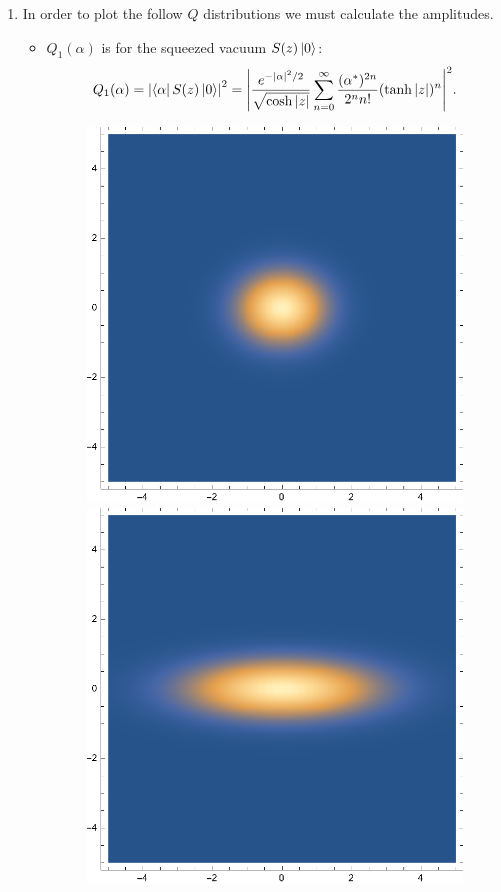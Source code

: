 \documentclass{article}
\theoremstyle{definition}
\newcommand{\al}{\alpha}
\newcommand{\f}[2]{\frac{#1}{#2}}
\begin{document}
\begin{enumerate}[label=(\alph*)]
\item In order to plot the follow $Q$ distributions we must calculate the amplitudes. 

\begin{itemize}

\item $Q_1(\al)$ is for the squeezed vacuum $S(z) \ket{0}$:
\begin{align*}
Q_1(\al) = \abs{\bra{\al} S(z) \ket{0}}^2 = \abs{\f{e^{-\abs{\al}^2/2}}{\sqrt{\cosh |z|}} \sum_{n=0}^\infty \f{(\al^*)^{2n}}{2^n n!} (\tanh |z|)^n}^2.
\end{align*}

\begin{figure}[!htb]
	\centering
	\begin{minipage}{.3\textwidth}
  	\centering
  	\includegraphics[width=.55\linewidth]{figures/Q1-z-02.eps}
	\end{minipage}%
	\begin{minipage}{.3\textwidth}
  	\centering
  	\includegraphics[width=.55\linewidth]{figures/Q1-z-12.eps}
	\end{minipage}

\end{figure}
\end{itemize}
\end{enumerate}
\end{document}
